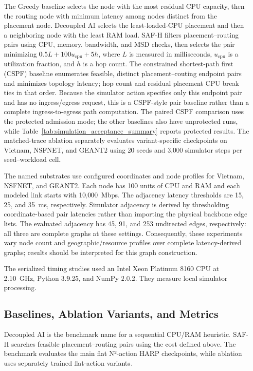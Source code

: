 \documentclass[final,5p]{elsarticle}
\newcommand{\rev}[1]{\textcolor{revisiongreen}{#1}}
\let\newrev\rev
\begin{document}
\newrev{The Greedy baseline selects the node with the most residual CPU capacity, then the routing node with minimum latency among nodes distinct from the placement node. Decoupled AI selects the least-loaded-CPU placement and then a neighboring node with the least RAM load. SAF-H filters placement--routing pairs using CPU, memory, bandwidth, and MSD checks, then selects the pair minimizing \(0.5L+100u_{\mathrm{cpu}}+5h\), where \(L\) is measured in milliseconds, \(u_{\mathrm{cpu}}\) is a utilization fraction, and \(h\) is a hop count. The constrained shortest-path first (CSPF) baseline enumerates feasible, distinct placement--routing endpoint pairs and minimizes topology latency; hop count and residual placement CPU break ties in that order. Because the simulator action specifies only this endpoint pair and has no ingress/egress request, this is a CSPF-style pair baseline rather than a complete ingress-to-egress path computation. The paired CSPF comparison uses the protected admission mode; the other baselines also have unprotected runs, while Table~\ref{tab:simulation_acceptance_summary} reports protected results. The matched-trace ablation separately evaluates variant-specific checkpoints on Vietnam, NSFNET, and GEANT2 using 20 seeds and 3,000 simulator steps per seed--workload cell.}

\newrev{The named substrates use configured coordinates and node profiles for Vietnam, NSFNET, and GEANT2. Each node has 100 units of CPU and RAM and each modeled link starts with 10,000~Mbps. The adjacency latency thresholds are 15, 25, and 35~ms, respectively. Simulator adjacency is derived by thresholding coordinate-based pair latencies rather than importing the physical backbone edge lists. The evaluated adjacency has 45, 91, and 253 undirected edges, respectively: all three are complete graphs at these settings. Consequently, these experiments vary node count and geographic/resource profiles over complete latency-derived graphs; results should be interpreted for this graph construction.}




\newrev{The serialized timing studies used an Intel Xeon Platinum 8160 CPU at 2.10~GHz, Python 3.9.25, and NumPy 2.0.2. They measure local simulator processing.}

\subsection{\newrev{Baselines, Ablation Variants, and Metrics}}
\label{subsec:baselines_metrics}
\newrev{Decoupled AI is the benchmark name for a sequential CPU/RAM heuristic. SAF-H searches feasible placement--routing pairs using the cost defined above. The benchmark evaluates the main flat N²-action HARP checkpoints, while ablation uses separately trained flat-action variants.}
\end{document}
